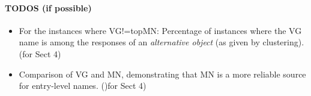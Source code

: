 
\paragraph{TODOS (if possible)}
\begin{itemize}
	\item For the instances where VG!=topMN: Percentage of instances where the VG name is among the responses of an \textit{alternative object} (as given by clustering). (for Sect 4)
	\item Comparison of VG and MN, demonstrating that MN is a more reliable source for entry-level names. ()for Sect 4)
\end{itemize}


